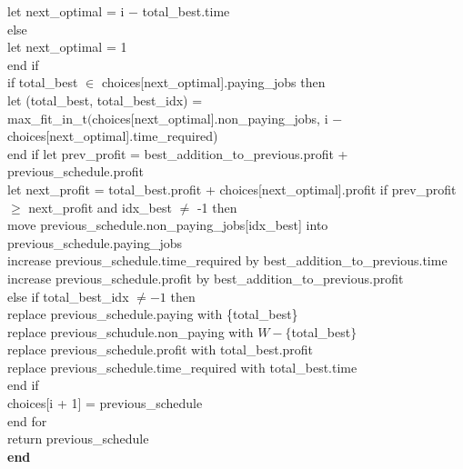 \documentclass{article}
\begin{document}
          \indent \indent let next\_optimal = i $-$ total\_best.time\\
          \indent else\\
          \indent \indent let next\_optimal = 1\\
          \indent end if\\
          \indent if total\_best $\in $ choices[next\_optimal].paying\_jobs then\\
          \indent \indent let (total\_best, total\_best\_idx) =\\
          \indent \indent \indent max\_fit\_in\_t$($choices[next\_optimal].non\_paying\_jobs, i $-$ choices[next\_optimal].time\_required)\\
          \indent end if
          \indent let prev\_profit = best\_addition\_to\_previous.profit + previous\_schedule.profit\\
          \indent let next\_profit = total\_best.profit + choices[next\_optimal].profit
          \indent if prev\_profit $\geq$ next\_profit and idx\_best $\neq$ -1 then\\
          \indent \indent move previous\_schedule.non\_paying\_jobs[idx\_best] into previous\_schedule.paying\_jobs\\
          \indent \indent increase previous\_schedule.time\_required by best\_addition\_to\_previous.time\\
          \indent \indent increase previous\_schedule.profit by best\_addition\_to\_previous.profit\\
          \indent else if total\_best\_idx $\neq -1$ then\\
          \indent \indent replace previous\_schedule.paying with \{total\_best\}\\
          \indent \indent replace previous\_schudule.non\_paying with $W - \{$total\_best$\}$\\
          \indent \indent replace previous\_schedule.profit with total\_best.profit\\
          \indent \indent replace previous\_schedule.time\_required with total\_best.time\\
          \indent end if\\
          \indent choices[i + 1] = previous\_schedule\\
          end for\\
          return previous\_schedule\\
        \textbf{end} \\
\end{document}
